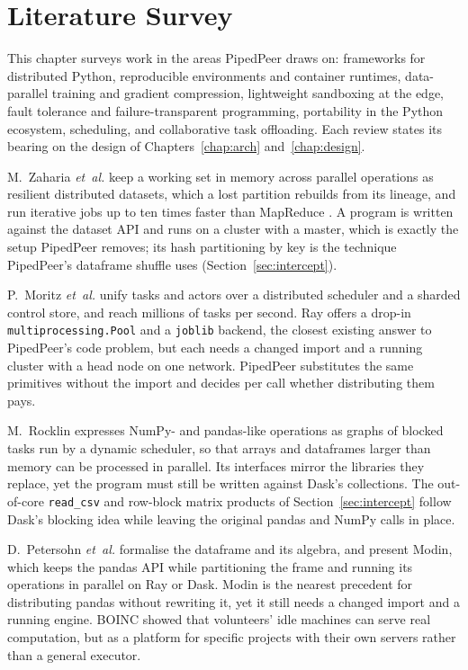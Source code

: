 \chapter{Literature Survey}
\label{chap:lit}

This chapter surveys work in the areas PipedPeer draws on: frameworks for
distributed Python, reproducible environments and container runtimes,
data-parallel training and gradient compression, lightweight sandboxing at the
edge, fault tolerance and failure-transparent programming, portability in the
Python ecosystem, scheduling, and collaborative task offloading. Each review
states its bearing on the design of Chapters~\ref{chap:arch}
and~\ref{chap:design}.

M.~Zaharia \textit{et~al.} \cite{zaharia2010spark} keep a working set in memory across parallel
operations as resilient distributed datasets, which a lost partition rebuilds
from its lineage, and run iterative jobs up to ten times faster than
MapReduce \cite{dean2004mapreduce}. A program is written against the dataset
API and runs on a cluster with a master, which is exactly the setup PipedPeer
removes; its hash partitioning by key is the technique PipedPeer's dataframe
shuffle uses (Section~\ref{sec:intercept}).

P.~Moritz \textit{et~al.} \cite{moritz2018ray} unify tasks and actors over
a distributed scheduler and a sharded control store, and reach millions of
tasks per second. Ray offers a drop-in \texttt{multiprocessing.Pool} and a
\texttt{joblib} backend, the closest existing answer to PipedPeer's code
problem, but each needs a changed import and a running cluster with a head
node on one network. PipedPeer substitutes the same primitives without the
import and decides per call whether distributing them pays.

M.~Rocklin \cite{rocklin2015dask} expresses NumPy- and pandas-like
operations as graphs of blocked tasks run by a dynamic scheduler, so that
arrays and dataframes larger than memory can be processed in parallel. Its
interfaces mirror the libraries they replace, yet the program must still be
written against Dask's collections. The out-of-core \texttt{read\_csv} and
row-block matrix products of Section~\ref{sec:intercept} follow Dask's blocking
idea while leaving the original pandas and NumPy calls in place.

D.~Petersohn \textit{et~al.} \cite{petersohn2020modin} formalise the dataframe and its algebra, and
present Modin, which keeps the pandas API while partitioning the frame and
running its operations in parallel on Ray or Dask. Modin is the nearest
precedent for distributing pandas without rewriting it, yet it still needs a
changed import and a running engine. BOINC \cite{anderson2004boinc} showed that
volunteers' idle machines can serve real computation, but as a platform for
specific projects with their own servers rather than a general executor.

